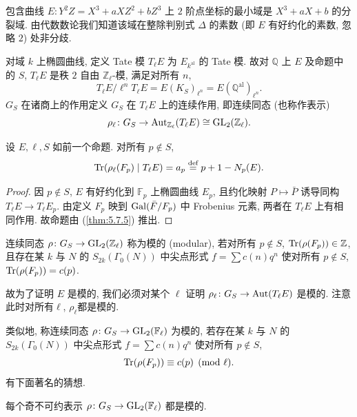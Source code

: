 \begin{example} \label{thm:5.8.2} 
包含曲线 $E\colon Y^2Z = X^3 + aXZ^2 + bZ^3$ 上 $2$ 阶点坐标的最小域是 $X^3 + aX + b$ 的分裂域. 由代数数论我们知道该域在整除判别式 $\Delta$ 的素数 (即 $E$ 有好约化的素数, 忽略 $2$) 处非分歧.
\end{example}

对域 $k$ 上椭圆曲线, 定义 Tate 模 $T_\ell E$ 为 $E_{k^{\mathrm{al}}}$ 的 Tate 模. 故对 $\mathbb{Q}$ 上 $E$ 及命题中的 $S$, $T_\ell E$ 是秩 $2$ 自由 $\mathbb{Z}_\ell$-模, 满足对所有 $n$,
\[
T_\ell E/\ell^n T_\ell E = E(K_S)_{\ell^n} = E(\mathbb{Q}^{\mathrm{al}})_{\ell^n}.
\]
$G_S$ 在诸商上的作用定义 $G_S$ 在 $T_\ell E$ 上的连续作用, 即连续同态 (也称作表示)
\[
\rho_\ell\colon G_S\to\operatorname{Aut}_{\mathbb{Z}_\ell}(T_\ell E)\cong\operatorname{GL}_2(\mathbb{Z}_\ell).
\]

\begin{proposition} \label{thm:5.8.3} 
设 $E, \ell, S$ 如前一个命题. 对所有 $p\notin S$,
\[
\operatorname{Tr}(\rho_\ell(F_p)\mid T_\ell E) = a_p \overset{\text{def}}{=} p + 1 - N_p(E).
\]
\end{proposition}

\begin{proof}
因 $p\notin S$, $E$ 有好约化到 $\mathbb{F}_p$ 上椭圆曲线 $E_p$, 且约化映射 $P\mapsto\bar{P}$ 诱导同构 $T_\ell E\to T_\ell E_p$. 由定义 $F_p$ 映到 $\operatorname{Gal}(\bar{F}/F_p)$ 中 Frobenius 元素, 两者在 $T_\ell E$ 上有相同作用. 故命题由 (\ref{thm:5.7.5}) 推出.
\end{proof}

\begin{definition} \label{thm:5.8.4} 
连续同态 $\rho\colon G_S\to\operatorname{GL}_2(\mathbb{Z}_\ell)$ 称为模的 (modular), 若对所有 $p\notin S$, $\operatorname{Tr}(\rho(F_p))\in\mathbb{Z}$, 且存在某 $k$ 与 $N$ 的 $S_{2k}(\Gamma_0(N))$ 中尖点形式 $f = \sum c(n)q^n$ 使对所有 $p\notin S$, $\operatorname{Tr}(\rho(F_p)) = c(p)$.
\end{definition}

故为了证明 $E$ 是模的, 我们必须对某个 $\ell$ 证明 $\rho_\ell\colon G_S\to\operatorname{Aut}(T_\ell E)$ 是模的. 注意此时对所有$\ell$, $\rho_\ell$都是模的.

类似地, 称连续同态 $\rho\colon G_S\to\operatorname{GL}_2(\mathbb{F}_\ell)$ 为模的, 若存在某 $k$ 与 $N$ 的 $S_{2k}(\Gamma_0(N))$ 中尖点形式 $f = \sum c(n)q^n$ 使对所有 $p\notin S$,
\[
\operatorname{Tr}(\rho(F_p))\equiv c(p) \pmod{\ell}.
\]
有下面著名的猜想.

\begin{conjecture}[Serre] \label{thm:5.8.5} 
每个奇不可约表示 $\rho\colon G_S\to\operatorname{GL}_2(\mathbb{F}_\ell)$ 都是模的.
\end{conjecture}

